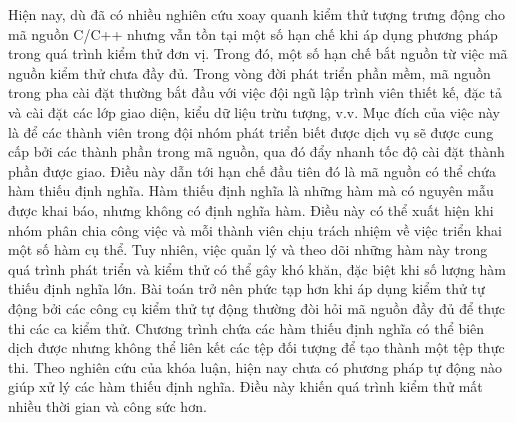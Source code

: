 Hiện nay, dù đã có nhiều nghiên cứu xoay quanh kiểm thử tượng trưng động cho mã nguồn C/C++ nhưng vẫn tồn tại một số hạn chế khi áp dụng phương pháp trong quá trình kiểm thử đơn vị. Trong đó, một số hạn chế bắt nguồn từ việc mã nguồn kiểm thử chưa đầy đủ. Trong vòng đời phát triển phần mềm, mã nguồn trong pha cài đặt thường bắt đầu với việc đội ngũ lập trình viên thiết kế, đặc tả và cài đặt các lớp giao diện, kiểu dữ liệu trừu tượng, v.v. Mục đích của việc này là để các thành viên trong đội nhóm phát triển biết được dịch vụ sẽ được cung cấp bởi các thành phần trong mã nguồn, qua đó đẩy nhanh tốc độ cài đặt thành phần được giao. Điều này dẫn tới hạn chế đầu tiên đó là mã nguồn có thể chứa hàm thiếu định nghĩa. Hàm thiếu định nghĩa là những hàm mà có nguyên mẫu được khai báo, nhưng không có định nghĩa hàm. Điều này có thể xuất hiện khi nhóm phân chia công việc và mỗi thành viên chịu trách nhiệm về việc triển khai một số hàm cụ thể. Tuy nhiên, việc quản lý và theo dõi những hàm này trong quá trình phát triển và kiểm thử có thể gây khó khăn, đặc biệt khi số lượng hàm thiếu định nghĩa lớn. Bài toán trở nên phức tạp hơn khi áp dụng kiểm thử tự động bởi các công cụ kiểm thử tự động thường đòi hỏi mã nguồn đầy đủ để thực thi các ca kiểm thử. Chương trình chứa các hàm thiếu định nghĩa có thể biên dịch được nhưng không thể liên kết các tệp đối tượng để tạo thành một tệp thực thi. Theo nghiên cứu của khóa luận, hiện nay chưa có phương pháp tự động nào giúp xử lý các hàm thiếu định nghĩa. Điều này khiến quá trình kiểm thử mất nhiều thời gian và công sức hơn. 
\vspace{5mm}
